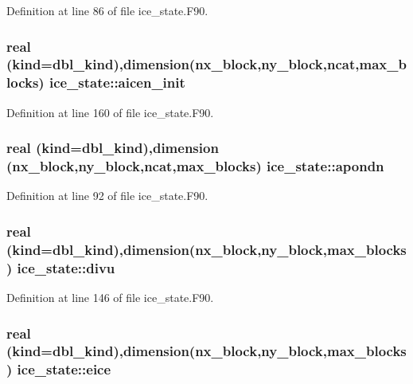 Definition at line 86 of file ice\_\-state.F90.\hypertarget{namespaceice__state_abbaa812633c91cc57a5bad8a2b43920a}{
\subsubsection[{aicen\_\-init}]{\setlength{\rightskip}{0pt plus 5cm}real (kind=dbl\_\-kind),dimension(nx\_\-block,ny\_\-block,ncat,max\_\-blocks) {\bf ice\_\-state::aicen\_\-init}}}
\label{namespaceice__state_abbaa812633c91cc57a5bad8a2b43920a}


Definition at line 160 of file ice\_\-state.F90.\hypertarget{namespaceice__state_aa2d9beee38aa0717dea2399d060d236d}{
\subsubsection[{apondn}]{\setlength{\rightskip}{0pt plus 5cm}real (kind=dbl\_\-kind),dimension (nx\_\-block,ny\_\-block,ncat,max\_\-blocks) {\bf ice\_\-state::apondn}}}
\label{namespaceice__state_aa2d9beee38aa0717dea2399d060d236d}


Definition at line 92 of file ice\_\-state.F90.\hypertarget{namespaceice__state_a1d4ddf61ed16b9ab3bf546bfb006628b}{
\subsubsection[{divu}]{\setlength{\rightskip}{0pt plus 5cm}real (kind=dbl\_\-kind),dimension(nx\_\-block,ny\_\-block,max\_\-blocks) {\bf ice\_\-state::divu}}}
\label{namespaceice__state_a1d4ddf61ed16b9ab3bf546bfb006628b}


Definition at line 146 of file ice\_\-state.F90.\hypertarget{namespaceice__state_aa30edd78b7a6855c7bfabf428b93f355}{
\subsubsection[{eice}]{\setlength{\rightskip}{0pt plus 5cm}real (kind=dbl\_\-kind),dimension(nx\_\-block,ny\_\-block,max\_\-blocks) {\bf ice\_\-state::eice}}}
\label{namespaceice__state_aa30edd78b7a6855c7bfabf428b93f355}


